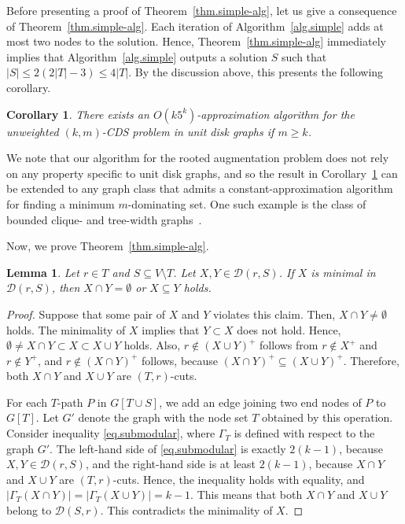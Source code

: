 \documentclass[11pt]{article}
\newcommand{\Dfam}{\mathcal{D}}
\newtheorem{lemma}{Lemma}
\newtheorem{corollary}{Corollary}
\begin{document}
Before presenting a proof of Theorem~\ref{thm.simple-alg},
let us give a consequence of Theorem~\ref{thm.simple-alg}.
Each iteration of
 Algorithm~\ref{alg.simple} adds at most two nodes to the solution.
 Hence, Theorem~\ref{thm.simple-alg} immediately implies
 that
 Algorithm~\ref{alg.simple} outputs a solution $S$ such that $|S|\leq
 2(2|T|-3)\leq 4|T|$.
 By the discussion above, this presents the following corollary.

   \begin{corollary}\label{cor.unweighted}
    There exists an $O(k5^k)$-approximation algorithm for 
    the unweighted $(k,m)$-CDS problem in unit disk graphs
    if $m \geq k$.
   \end{corollary}

   We note that our algorithm for the rooted augmentation problem
   does not rely on any property specific to unit disk graphs, and so
  the result in Corollary~\ref{cor.unweighted}
   can be extended to any graph class that admits a 
   constant-approximation algorithm for
   finding a minimum $m$-dominating set.
   One such example
   is the class of 
   bounded clique- and tree-width graphs~\cite{CicaleseCGMV14}.
   

 
 Now, we prove Theorem~\ref{thm.simple-alg}.
 \begin{lemma}
  \label{lem.crossing}
  Let $r \in T$ and $S \subseteq V \setminus T$.
  Let $X,Y \in \Dfam(r,S)$. If $X$ is minimal in $\Dfam(r,S)$, then
  $X\cap Y=\emptyset$ or $X \subseteq Y$ holds.
  \end{lemma}
\begin{proof}
 Suppose that
 some pair of $X$ and $Y$ violates this claim.
  Then, $X\cap Y \neq \emptyset$ holds.
  The minimality of $X$ implies that $Y \subset X$ does not
 hold.
  Hence, 
 $\emptyset \neq X \cap Y \subset X \subset X \cup Y$ holds.
 Also, $r \not\in (X \cup Y)^+$ follows from
 $r \not \in X^+$ and $r \not \in Y^+$, and
 $r \not\in (X \cap Y)^+$ follows, because
 $(X \cap Y)^+ \subseteq (X\cup Y)^+$.
 Therefore, both $X \cap Y$ and $X\cup Y$ are $(T,r)$-cuts.

 For each $T$-path $P$ in $G[T\cup S]$,
 we add an edge joining two end nodes of $P$ to $G[T]$.
 Let $G'$ denote the graph with the node set $T$ obtained by this operation. 
 Consider inequality \eqref{eq.submodular}, where $\Gamma_T$ is
 defined with respect to the graph $G'$.
 The left-hand side of  \eqref{eq.submodular} is exactly $2(k-1)$,
 because $X, Y \in \Dfam(r,S)$,
 and the right-hand side is at least $2(k-1)$,
 because $X\cap Y$ and $X \cup Y$ are $(T,r)$-cuts.
 Hence, the inequality holds with equality, and
 $|\Gamma_T(X \cap Y)| =|\Gamma_T(X \cup Y)| =k-1$.
 This means that both $X \cap Y$ and $X \cup Y$ belong to $\Dfam(S,r)$.
 This contradicts the minimality  of $X$.
\end{proof}
\end{document}
